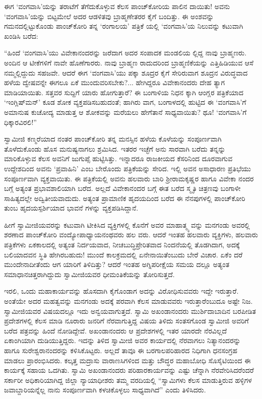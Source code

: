 ಈಗ ‘ವಂಗವಾಸಿ’ಯನ್ನು ತರಾಟೆಗೆ ತೆಗೆದುಕೊಳ್ಳುವ ಕೆಲಸ ಪಾಂಚ್​ಕೋರಿಯ ಪಾಲಿನ ದಾಯಿತು! ಅವನು ‘ವಂಗವಾಸಿ’ಯನ್ನು ಬಿಟ್ಟಮೇಲೆ ಅದರ ಆಡಳಿತವು ಬ್ರಾಹ್ಮಣೇತರರ ಕೈಗೆ ಬಂದಿತ್ತು. ಈ ಅಂಶವನ್ನು ಗಮನದಲ್ಲಿಟ್ಟುಕೊಂಡು ಪಾಂಚ್​ಕೋರಿ ತನ್ನ ‘ರಂಗಾಲಯ’ ಪತ್ರಿಕೆ ಯಲ್ಲಿ ‘ವಂಗವಾಸಿ’ಯ ನಿಲುವನ್ನು ಕಟುವಾಗಿ ಖಂಡಿಸಿ ಬರೆದ:

“ಹಿಂದೆ ‘ವಂಗವಾಸಿ’ಯು ವಿವೇಕಾನಂದರನ್ನು ಜರೆದಾಗ ಅದರ ಸಂಪಾದಕ ಮಂಡಲಿಯ ಲ್ಲಿದ್ದ ನಾವು ಬ್ರಾಹ್ಮಣರು. ಅಂದಿನ ಆ ಟೀಕೆಗಳಿಗೆ ನಾವೇ ಹೊಣೆಗಾರರು. ನಾವು ಬ್ರಾಹ್ಮಣ ರಾದುದರಿಂದ ಬ್ರಾಹ್ಮಣಿಕೆಯನ್ನು ಎತ್ತಿಹಿಡಿಯುವ ಆಸೆ ನಮ್ಮಲ್ಲಿದ್ದುದು ಸಹಜವೇ. ಆದರೆ ಈಗ ‘ವಂಗವಾಸಿ’ಯು ಪಕ್ಕಾ ಶೂದ್ರರ ಕೈಗೆ ಸೇರಿರುವಾಗ ಶೂದ್ರನ ವಿರುದ್ಧವಾದ ಹಳೆಯ ದ್ವೇಷವನ್ನೇ ಈಗಲೂ ಏಕೆ ಮುಂದುವರಿಸಬೇಕು?... ಹೇಗಿದ್ದರೂ ವಿವೇಕಾನಂದರು ದೇಹ ತ್ಯಾಗ ಮಾಡಿಯಾಯಿತು. ಸತ್ತವರ ಸುದ್ದಿಗೆ ಯಾರು ಹೋಗುತ್ತಾರೆ? ಈ ಬಂಗಾಳಿಯ ನಿಧನ ಕ್ಕಾಗಿ ಆಂಗ್ಲರ ಪತ್ರಿಕೆಯಾದ ‘ಇಂಗ್ಲಿಷ್​ಮನ್​’ ಕೂಡ ಶೋಕ ವ್ಯಕ್ತಪಡಿಸಬಹುದಂತೆ; ಹಾಗಿರು ವಾಗ, ಬಂಗಾಳದಲ್ಲಿ ಹುಟ್ಟಿದ ಈ ‘ವಂಗವಾಸಿ’ಗೆ ಅಮಾನುಷ ಕುಚೋದ್ಯ ಮಾಡುತ್ತ ಆ ಶೋಕವನ್ನು ಮರೆಯಲು ಹೇಗೆತಾನೆ ಸಾಧ್ಯವಾಯಿತು? ಥೂ! ‘ವಂಗವಾಸಿ’ಗೆ ಧಿಕ್ಕಾರವಿರಲಿ!”

ಸ್ವಾಮೀಜಿ ಕಣ್ಮರೆಯಾದ ನಂತರ ಪಾಂಚ್​ಕೋರಿ ತನ್ನ ಮನಸ್ಸಿನ ಹಳೆಯ ಕೊಳೆಯನ್ನು ಸಂಪೂರ್ಣವಾಗಿ ತೊಳೆದುಕೊಂಡು ಹೊಸ ಮನುಷ್ಯನಾಗಲು ಶ್ರಮಿಸಿದ. ಇತರರ ಇಚ್ಛೆಗೆ ಅನು ಸಾರವಾಗಿ ಬರೆದು ತನ್ನನ್ನು ಮಾರಿಕೊಳ್ಳುವ ಕೆಲಸ ಅವನಿಗೆ ಜುಗುಪ್ಸೆ ಹುಟ್ಟಿಸಿತ್ತು. ಇನ್ನಾದರೂ ರಾಜಕೀಯದ ಕೆಸರಿನಿಂದ ದೂರವಾಗುವ ಉದ್ದೇಶದಿಂದ ಅವನು ‘ಪ್ರವಾಹಿನಿ’ ಎಂಬ ಬೇರೊಂದು ಪತ್ರಿಕೆಯನ್ನು ಸೇರಿದ. ಇಲ್ಲಿ ಅವನ ಅಸಾಧಾರಣ ಪ್ರತಿಭೆಯು ಸಂಪೂರ್ಣವಾಗಿ ವ್ಯಕ್ತವಾಯಿತು. ಈ ಪತ್ರಿಕೆಯಲ್ಲಿ ಅವನು ಹಲವಾರು ಬಾರಿ ಶ್ರೀರಾಮಕೃಷ್ಣರ ಹಾಗೂ ವಿವೇಕಾ ನಂದರ ಬಗ್ಗೆ ಅತ್ಯಂತ ಪ್ರಭಾವಶಾಲಿಯಾಗಿ ಬರೆದ. ಅಲ್ಲದೆ ವಿವೇಕಾನಂದರ ಬಗ್ಗೆ ಈತ ಬರೆದ ಸ್ಮೃತಿ ಚಿತ್ರಣವು ಬಂಗಾಳೀ ಸಾಹಿತ್ಯದಲ್ಲೇ ಅದ್ವಿತೀಯವಾದುದು. ಅತ್ಯಂತ ಪ್ರಾಮಾಣಿಕ ಹೃದಯದಿಂದ ಬರೆದ ಈ ನೆನಪುಗಳಲ್ಲಿ ಪಾಂಚ್​ಕೋರಿ ತುಂಬ ಹೃದಯಸ್ಪರ್ಶಿಯಾದ ಭಾವನೆ ಗಳನ್ನು ವ್ಯಕ್ತಪಡಿಸಿದ್ದಾನೆ.

ಹೀಗೆ ಸ್ವಾಮೀಜಿಯವರನ್ನು ಕಟುವಾಗಿ ಟೀಕಿಸಿದ ವ್ಯಕ್ತಿಗಳಲ್ಲಿ ಕೊನೆಗೆ ಅವರ ಮಾಹಾತ್ಮ್ಯ ವನ್ನು ಮನಗಂಡು ಅವರಲ್ಲಿ ಶರಣಾದ ಪಾಂಚ್​ಕೋರಿ ವಂದ್ಯೋಪಾಧ್ಯಾಯನಂಥವರು ಹಲ ವರು. ಆದರೆ ಇಂತಹ ಹಲವಾರು ವ್ಯಕ್ತಿಗಳು, ಹಲವಾರು ಪತ್ರಿಕೆಗಳು ಏಕಕಾಲದಲ್ಲಿ ಅತ್ಯಂತ ನಿರ್ದಯವಾದ, ನೀಚಬುದ್ಧಿಪ್ರೇರಿತವಾದ ನಿಂದನೆಯಲ್ಲಿ ತೊಡಗಿದಾಗ, ಅದಕ್ಕೆ ಬಲಿಯಾದವನ ಸ್ಥಿತಿ ಹೇಗಿರಬಹುದು! ಮುಂದೆ ಕಾಲಕ್ರಮದಲ್ಲಿ ಏನೇನಾಯಿತೆಂಬುದು ಬೇರೆ ವಿಚಾರ. ಏಕೆಂ ದರೆ ಮುಂದೇನಾದೀತೆಂದು ಆಗ ಯಾರಿಗೆ ತಿಳಿದಿತ್ತು? ಆದರೆ ಇಂತಹ ಅಗ್ನಿಪರೀಕ್ಷೆಯ ಸಮಯ ದಲ್ಲೂ ಅತ್ಯಂತ ಸಮಾಧಾನಚಿತ್ತರಾಗಿದ್ದುದು ಸ್ವಾಮೀಜಿಯವರ ಧೀಮಂತಿಕೆಯನ್ನು ತೋರಿಸುತ್ತದೆ.

ಇರಲಿ, ಒಂದು ಮಹಾಕಾರ್ಯವನ್ನು ಹೊಸದಾಗಿ ಕೈಗೊಂಡಾಗ ಅದನ್ನು ವಿರೋಧಿಸುವವರು ಇದ್ದೇ ಇರುತ್ತಾರೆ. ಅಂತೆಯೇ ಅದರ ಮಹತ್ವವನ್ನು ಮನಗಂಡು ಅದಕ್ಕೆ ಪರವಾಗಿ ಕೆಲಸ ಮಾಡುವವರು ಇರುತ್ತಾರೆಂಬುದೂ ಅಷ್ಟೇ ನಿಜ. ಸ್ವಾಮೀಜಿಯವರ ವಿಷಯದಲ್ಲೂ ಇದು ಅನ್ವಯವಾಗುತ್ತದೆ. ಸ್ವಾಮಿ ಅಖಂಡಾನಂದರು ಮುರ್ಶಿದಾಬಾದಿನ ಬರಪೀಡಿತ ಪ್ರದೇಶಗಳಲ್ಲಿ ಕೆಲಸ ಮಾಡಿ ನೂರಾರು ಜನರಿಗೆ ನೆರವಾಗುತ್ತಿದ್ದ ವಿಷಯ ತಿಳಿದು ಸಂತಸಗೊಂಡ ಸ್ವಾಮೀಜಿ ಅವರಿಗೆ ಬರೆದ ಪತ್ರವನ್ನು ಹಿಂದೆ ನೋಡಿದ್ದೇವೆ. ಅಖಂಡಾನಂದರು ಆ ಪ್ರದೇಶಗಳಲ್ಲಿ ಇತರ ಯಾರದೇ ನೆರವಿಲ್ಲದೆ ಏಕಾಂಗಿಯಾಗಿ ದುಡಿಯುತ್ತಿದ್ದರು. ಇದನ್ನು ತಿಳಿದ ಸ್ವಾಮೀಜಿ ಅವರ ಕಾರ್ಯದಲ್ಲಿ ನೆರವಾಗಲು ನಿತ್ಯಾನಂದರನ್ನು ಹಾಗೂ ಸುರೇಶ್ವರಾನಂದರನ್ನು ಕಳಿಸಿಕೊಟ್ಟರು. ಅಲ್ಲದೆ ತಾವೂ ಈ ಬರಗಾಲಪರಿಹಾರದ ನಿಧಿಗಾಗಿ ಧನಸಂಗ್ರಹ ಮಾಡಲು ಪ್ರಾರಂಭಿಸಿದರು. ಕಲ್ಕತ್ತ ಮದ್ರಾಸು ವಾರಾಣಸಿಗಳಿಂದ ಮತ್ತು ಬೌದ್ಧರ ಮಹಾಬೋಧಿ ಸೊಸೈಟಿಯಿಂದ ಈ ಕಾರ್ಯಕ್ಕೆ ಸಹಾಯ ಒದಗಿತು. ಸ್ವಾಮಿ ಅಖಂಡಾನಂದರು ಪರಿಹಾರಕಾರ್ಯವನ್ನು ಎಷ್ಟು ಚೆನ್ನಾಗಿ ನೆರವೇರಿಸಿದರೆಂದರೆ ಸರ್ಕಾರೀ ಅಧಿಕಾರಿಯಾಗಿದ್ದ ಜಿಲ್ಲಾ ನ್ಯಾಯಾಧೀಶರು ತಮ್ಮ ವರದಿಯಲ್ಲಿ “ಸ್ವಾಮಿಗಳು ಕೆಲಸ ಮಾಡುತ್ತಿರುವ ಹಳ್ಳಿಗಳ ಜವಾಬ್ದಾರಿಯನ್ನೆಲ್ಲ ನಾನು ಸಂಪೂರ್ಣವಾಗಿ ಕಳಚಿಕೊಳ್ಳಲು ಸಾಧ್ಯವಾಗಿದೆ” ಎಂದು ತಿಳಿಸಿದರು.

